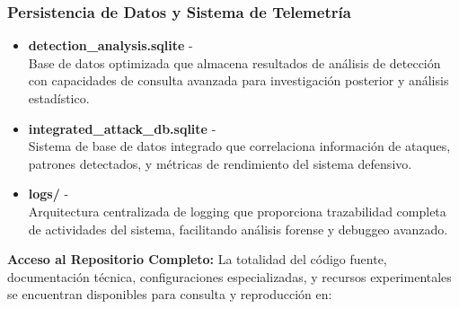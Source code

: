 \subsubsection*{Persistencia de Datos y Sistema de Telemetría}
\begin{itemize}
    \item \textbf{detection\_analysis.sqlite} -  \\
    Base de datos optimizada que almacena resultados de análisis de detección con capacidades de consulta avanzada para investigación posterior y análisis estadístico.
    
    \item \textbf{integrated\_attack\_db.sqlite} -  \\
    Sistema de base de datos integrado que correlaciona información de ataques, patrones detectados, y métricas de rendimiento del sistema defensivo.
    
    \item \textbf{logs/} -  \\
    Arquitectura centralizada de logging que proporciona trazabilidad completa de actividades del sistema, facilitando análisis forense y debuggeo avanzado.
\end{itemize}

\vspace{1cm}
\noindent\textbf{Acceso al Repositorio Completo:} La totalidad del código fuente, documentación técnica, configuraciones especializadas, y recursos experimentales se encuentran disponibles para consulta y reproducción en: 